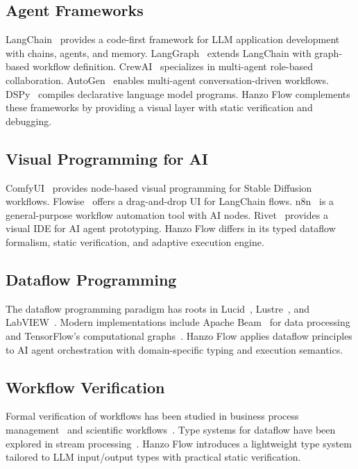 \documentclass[11pt,twocolumn]{article}
\begin{document}
\subsection{Agent Frameworks}

LangChain~\cite{langchain2023} provides a code-first framework for LLM application development with chains, agents, and memory. LangGraph~\cite{langgraph2024} extends LangChain with graph-based workflow definition. CrewAI~\cite{crewai2024} specializes in multi-agent role-based collaboration. AutoGen~\cite{wu2023autogen} enables multi-agent conversation-driven workflows. DSPy~\cite{khattab2023dspy} compiles declarative language model programs. Hanzo Flow complements these frameworks by providing a visual layer with static verification and debugging.

\subsection{Visual Programming for AI}

ComfyUI~\cite{comfyui2023} provides node-based visual programming for Stable Diffusion workflows. Flowise~\cite{flowise2023} offers a drag-and-drop UI for LangChain flows. n8n~\cite{n8n2024} is a general-purpose workflow automation tool with AI nodes. Rivet~\cite{rivet2023} provides a visual IDE for AI agent prototyping. Hanzo Flow differs in its typed dataflow formalism, static verification, and adaptive execution engine.

\subsection{Dataflow Programming}

The dataflow programming paradigm has roots in Lucid~\cite{wadge1985lucid}, Lustre~\cite{halbwachs1991synchronous}, and LabVIEW~\cite{labview2003}. Modern implementations include Apache Beam~\cite{beam2016} for data processing and TensorFlow's computational graphs~\cite{abadi2016tensorflow}. Hanzo Flow applies dataflow principles to AI agent orchestration with domain-specific typing and execution semantics.

\subsection{Workflow Verification}

Formal verification of workflows has been studied in business process management~\cite{van2003workflow} and scientific workflows~\cite{deelman2005pegasus}. Type systems for dataflow have been explored in stream processing~\cite{hirzel2014catalog}. Hanzo Flow introduces a lightweight type system tailored to LLM input/output types with practical static verification.
\end{document}
